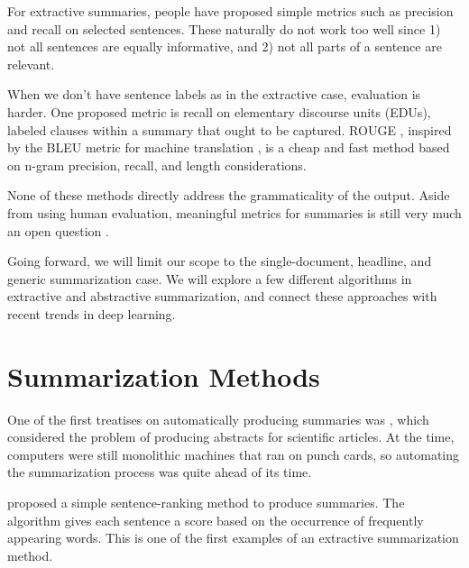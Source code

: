 \documentclass[12pt]{report}
\begin{document}
For extractive summaries, people have proposed simple metrics such as precision and recall on selected sentences. These naturally do not work too well since 1) not all sentences are equally informative, and 2) not all parts of a sentence are relevant.

When we don't have sentence labels as in the extractive case, evaluation is harder. One proposed metric is recall on elementary discourse units (EDUs), labeled clauses within a summary that ought to be captured. ROUGE \citep{lin2004rouge}, inspired by the BLEU metric for machine translation \citep{Papineni2002}, is a cheap and fast method based on n-gram precision, recall, and length considerations.


None of these methods directly address the grammaticality of the output. Aside from using human evaluation, meaningful metrics for summaries is still very much an open question \citep{toutanova2016summarymetrics}.


\vspace{0.5cm}

 



Going forward, we will limit our scope to the single-document, headline, and generic summarization case. We will explore a few different algorithms in extractive and abstractive summarization, and connect these approaches with recent trends in deep learning.

\section{Summarization Methods}

One of the first treatises on automatically producing summaries was \citet{luhn1958automatic}, which considered the problem of producing abstracts for scientific articles. At the time, computers were still monolithic machines that ran on punch cards, so automating the summarization process was quite ahead of its time.

\citet{luhn1958automatic} proposed a simple sentence-ranking method to produce summaries. The algorithm gives each sentence a score based on the occurrence of frequently appearing words. This is one of the first examples of an extractive summarization method.
\end{document}
